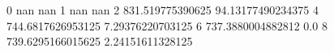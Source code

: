 0 nan nan
1 nan nan
2 831.519775390625 94.13177490234375
4 744.6817626953125 7.29376220703125
6 737.3880004882812 0.0
8 739.6295166015625 2.24151611328125
